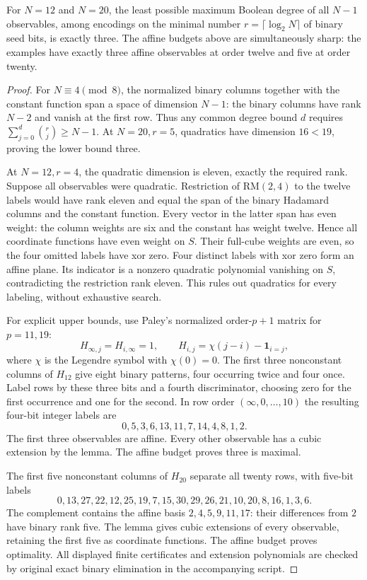 \begin{theorem}
\label{s18:thm:nonlinear-cubic}
For $N=12$ and $N=20$, the least possible maximum Boolean degree of
all $N-1$ observables, among encodings on the minimal number
$r=\lceil\log_2N\rceil$ of binary seed bits, is exactly three.
The affine budgets above are simultaneously sharp: the examples have
exactly three affine observables at order twelve and five at order twenty.
\end{theorem}
\begin{proof}
For $N\equiv4\pmod8$, the normalized binary columns together with the
constant function span a space of dimension $N-1$: the binary columns
have rank $N-2$ and vanish at the first row. Thus any common degree
bound $d$ requires
$\sum_{j=0}^d\binom rj\ge N-1$.
At $N=20,r=5$, quadratics have dimension $16<19$, proving the lower
bound three.

At $N=12,r=4$, the quadratic dimension is eleven, exactly the required
rank. Suppose all observables were quadratic. Restriction of
$\mathrm{RM}(2,4)$ to the twelve labels would have rank eleven and equal
the span of the binary Hadamard columns and the constant function.
Every vector in the latter span has even weight: the column weights
are six and the constant has weight twelve. Hence all coordinate
functions have even weight on $S$. Their full-cube weights are even,
so the four omitted labels have xor zero. Four distinct labels with xor
zero form an affine plane. Its indicator is a nonzero quadratic
polynomial vanishing on $S$, contradicting the restriction rank eleven.
This rules out quadratics for every labeling, without exhaustive search.

For explicit upper bounds, use Paley's normalized order-$p+1$ matrix
for $p=11,19$:
\[
 H_{\infty,j}=H_{i,\infty}=1,\qquad
 H_{i,j}=\chi(j-i)-\mathbf1_{i=j},
\]
where $\chi$ is the Legendre symbol with $\chi(0)=0$.
The first three nonconstant columns of $H_{12}$ give eight binary
patterns, four occurring twice and four once. Label rows by these
three bits and a fourth discriminator, choosing zero for the first
occurrence and one for the second. In row order $(\infty,0,\ldots,10)$
the resulting four-bit integer labels are
\[
 0,5,3,6,13,11,7,14,4,8,1,2.
\]
The first three observables are affine. Every other observable has a
cubic extension by the lemma. The affine budget proves three is maximal.

The first five nonconstant columns of $H_{20}$ separate all twenty
rows, with five-bit labels
\[
 0,13,27,22,12,25,19,7,15,30,29,26,21,10,20,8,16,1,3,6.
\]
The complement contains the affine basis
$2,4,5,9,11,17$: their differences from $2$ have binary rank five.
The lemma gives cubic extensions of every observable, retaining the
first five as coordinate functions. The affine budget proves optimality.
All displayed finite certificates and extension polynomials are checked
by original exact binary elimination in the accompanying script.
\end{proof}


